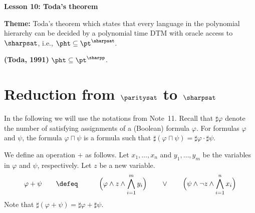 \documentclass[11pt, a4paper]{article}
\renewcommand{\lesson}{10}
\renewcommand{\lessontitle}{Toda's theorem}
\renewcommand{\fulltitle}{Lesson \lesson: \lessontitle}
\begin{document}
\date{}



\begin{center}
{\Large {\bf \fulltitle}}
\end{center}
\vspace{0.5cm}

\noindent
{\bf Theme:} Toda's theorem which states that every language in the polynomial hierarchy can be decided by a polynomial time DTM
 with oracle access to $\sharpsat$, i.e., $\pht \subseteq \pt^{\sharpsat}$.

\vspace{0.5cm}

\begin{theorem}
\label{theo:toda}
{\bf (Toda, 1991)}
$\pht\subseteq \pt^{\sharpp}$.
\end{theorem}


\section{Reduction from $\paritysat$ to $\sharpsat$} 

In the following we will use the notations from Note~11.
Recall that $\sharp \varphi$ denote the number of satisfying assignments of a (Boolean) formula $\varphi$.
For formulas $\varphi$ and $\psi$,
the formula $\varphi\sqcap\psi$ is a formula such that $\sharp(\varphi\sqcap\psi) = \sharp\varphi \cdot \sharp\psi$.

We define an operation $+$ as follows.
Let $x_1,\ldots,x_n$ and $y_1,\ldots,y_m$ be the variables in $\varphi$ and $\psi$, respectively.
Let $z$ be a new variable.
\begin{eqnarray*}
\varphi+\psi\qquad & \defeq &\qquad
\Big(\varphi \wedge z \wedge \bigwedge_{i=1}^m y_i\Big)
\qquad \vee \qquad
\Big(\psi \wedge \neg z \wedge \bigwedge_{i=1}^n x_i\Big)
\end{eqnarray*}
Note that $\sharp(\varphi+\psi) = \sharp\varphi + \sharp \psi$.
\end{document}
